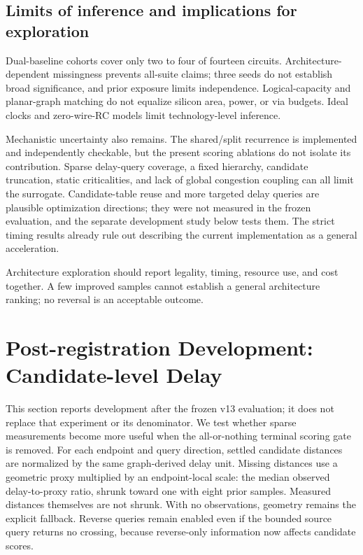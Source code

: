 \documentclass[conference,10pt]{IEEEtran}
\begin{document}
\subsection{Limits of inference and implications for exploration}
Dual-baseline cohorts cover only two to four of fourteen circuits. Architecture-dependent missingness prevents all-suite claims; three seeds do not establish broad significance, and prior exposure limits independence. Logical-capacity and planar-graph matching do not equalize silicon area, power, or via budgets. Ideal clocks and zero-wire-RC models limit technology-level inference.

Mechanistic uncertainty also remains. The shared/split recurrence is implemented and independently checkable, but the present scoring ablations do not isolate its contribution. Sparse delay-query coverage, a fixed hierarchy, candidate truncation, static criticalities, and lack of global congestion coupling can all limit the surrogate. Candidate-table reuse and more targeted delay queries are plausible optimization directions; they were not measured in the frozen evaluation, and the separate development study below tests them. The strict timing results already rule out describing the current implementation as a general acceleration.

Architecture exploration should report legality, timing, resource use, and cost together. A few improved samples cannot establish a general architecture ranking; no reversal is an acceptable outcome.


\section{Post-registration Development: Candidate-level Delay}
This section reports development after the frozen v13 evaluation; it does not replace that experiment or its denominator. We test whether sparse measurements become more useful when the all-or-nothing terminal scoring gate is removed. For each endpoint and query direction, settled candidate distances are normalized by the same graph-derived delay unit. Missing distances use a geometric proxy multiplied by an endpoint-local scale: the median observed delay-to-proxy ratio, shrunk toward one with eight prior samples. Measured distances themselves are not shrunk. With no observations, geometry remains the explicit fallback. Reverse queries remain enabled even if the bounded source query returns no crossing, because reverse-only information now affects candidate scores.
\end{document}
